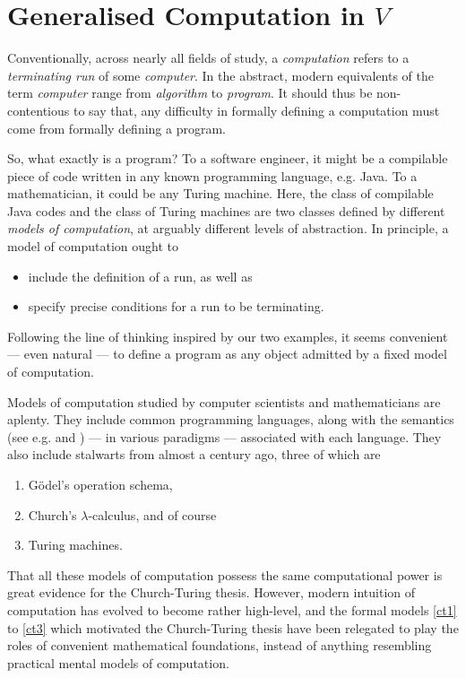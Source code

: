 \documentclass[12pt, twoside]{memoir}
\numberwithin{equation}{section}
\theoremstyle{definition}
\theoremstyle{remark}
\theoremstyle{definition}
\theoremstyle{definition}
\theoremstyle{definition}
\theoremstyle{remark}
\begin{document}
\chapter{Generalised Computation in $V$}\label{chap6}

Conventionally, across nearly all fields of study, a \textit{computation} refers to a \textit{terminating run} of some \textit{computer}. In the abstract, modern equivalents of the term \textit{computer} range from \textit{algorithm} to \textit{program}. It should thus be non-contentious to say that, any difficulty in formally defining a computation must come from formally defining a program.

So, what exactly is a program? To a software engineer, it might be a compilable piece of code written in any known programming language, e.g. Java. To a mathematician, it could be any Turing machine. Here, the class of compilable Java codes and the class of Turing machines are two classes defined by different \textit{models of computation}, at arguably different levels of abstraction. In principle, a model of computation ought to 
\begin{itemize}
    \item include the definition of a run, as well as
    \item specify precise conditions for a run to be terminating.
\end{itemize} 
Following the line of thinking inspired by our two examples, it seems convenient --- even natural --- to define a program as any object admitted by a fixed model of computation. 

Models of computation studied by computer scientists and mathematicians are aplenty. They include common programming languages, along with the semantics (see e.g.\cite{scott} and \cite{meyer}) --- in various paradigms --- associated with each language. They also include stalwarts from almost a century ago, three of which are
\begin{enumerate}[leftmargin=40pt, label=(CT\arabic*)]
    \item\label{ct1} G\"{o}del's operation schema,
    \item Church's $\lambda$-calculus, and of course
    \item\label{ct3} Turing machines.
\end{enumerate}
That all these models of computation possess the same computational power is great evidence for the Church-Turing thesis. However, modern intuition of computation has evolved to become rather high-level, and the formal models \ref{ct1} to \ref{ct3} which motivated the Church-Turing thesis have been relegated to play the roles of convenient mathematical foundations, instead of anything resembling practical mental models of computation.
\end{document}
